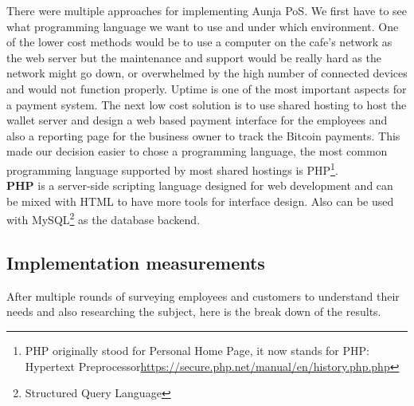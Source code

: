 There were multiple approaches for implementing Aunja PoS. We first have to see what programming language we want to use and under which environment. One of the lower cost methods would be to use a computer on the cafe's network as the web server but the maintenance and support would be really hard as the network might go down, or overwhelmed by the high number of connected devices and would not function properly. Uptime is one of the most important aspects for a payment system. The next low cost solution is to use shared hosting to host the wallet server and design a web based payment interface for the employees and also a reporting page for the business owner to track the Bitcoin payments. This made our decision easier to chose a programming language, the most common programming language supported by most shared hostings is PHP\footnote{PHP originally stood for Personal Home Page, it now stands for PHP: Hypertext Preprocessor\url{https://secure.php.net/manual/en/history.php.php}}. 
\\ \textbf{PHP} is a server-side scripting language designed for web development and can be mixed with HTML to have more tools for interface design. Also can be used with MySQL\footnote{Structured Query Language} as the database backend.

\subsection{Implementation measurements}
After multiple rounds of surveying employees and customers to understand their needs and also researching the subject, here is the break down of the results.
